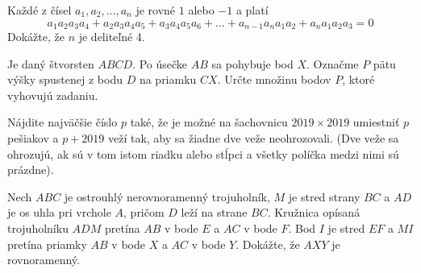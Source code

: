 {{
Každé z čísel $a_1, a_2, \dots , a_n$ je rovné $1$ alebo $-1$ a platí 
$$a_1a_2a_3a_4 + a_2a_3a_4a_5 + a_3a_4a_5a_6 + \dots + a_{n-1}a_na_1a_2 + a_na_1a_2a_3 = 0$$
Dokážte, že $n$ je deliteľné 4.
}


\or


{
Je daný štvorsten $ABCD$. Po úsečke $AB$ sa pohybuje bod $X$. Označme $P$ pätu výšky spustenej z bodu $D$ na priamku $CX$. Určte množinu bodov $P$, ktoré vyhovujú zadaniu.
}

\or


{
Nájdite najväčšie číslo $p$ také, že je možné na šachovnicu $2019\times 2019$ umiestniť $p$ pešiakov a $p+2019$ veží tak, aby sa žiadne dve veže neohrozovali. (Dve veže sa ohrozujú, ak sú v tom istom riadku alebo stĺpci a všetky políčka medzi nimi sú prázdne).
}


\or


{
Nech $ABC$ je ostrouhlý nerovnoramenný trojuholník, $M$ je stred strany $BC$ a $AD$ je os uhla pri vrchole $A$, pričom $D$ leží na strane $BC$. Kružnica opísaná trojuholníku $ADM$ pretína $AB$ v bode $E$ a $AC$ v bode $F$. Bod $I$ je stred $EF$ a $MI$ pretína priamky $AB$ v bode $X$ a $AC$ v bode $Y$. Dokážte, že $AXY$ je rovnoramenný.
}


\fi

\fi

}


